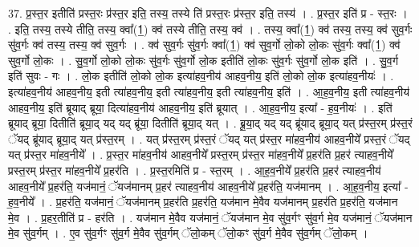 \documentclass[17pt]{extarticle}
\begin{document}
37. प्र॒स्त॒र इतीति॑ प्रस्त॒रः प्र॑स्त॒र इति॒ तस्य॒ तस्ये ति॑ प्रस्त॒रः प्र॑स्त॒र इति॒ तस्य॑ । . प्र॒स्त॒र इति॑ प्र - स्त॒रः । . इति॒ तस्य॒ तस्ये तीति॒ तस्य॒ क्वा᳚(1॒) क्व॑ तस्ये तीति॒ तस्य॒ क्व॑ । . तस्य॒ क्वा᳚(1॒) क्व॑ तस्य॒ तस्य॒ क्व॑ सुव॒र्गः सु॑व॒र्गः क्व॑ तस्य॒ तस्य॒ क्व॑ सुव॒र्गः । . क्व॑ सुव॒र्गः सु॑व॒र्गः क्वा᳚(1॒) क्व॑ सुव॒र्गो लो॒को लो॒कः सु॑व॒र्गः क्वा᳚(1॒) क्व॑ सुव॒र्गो लो॒कः । . सु॒व॒र्गो लो॒को लो॒कः सु॑व॒र्गः सु॑व॒र्गो लो॒क इतीति॑ लो॒कः सु॑व॒र्गः सु॑व॒र्गो लो॒क इति॑ । . सु॒व॒र्ग इति॑ सुवः - गः । . लो॒क इतीति॑ लो॒को लो॒क इत्या॑हव॒नीय॑ आहव॒नीय॒ इति॑ लो॒को लो॒क इत्या॑हव॒नीयः॑ । . इत्या॑हव॒नीय॑ आहव॒नीय॒ इती त्या॑हव॒नीय॒ इती त्या॑हव॒नीय॒ इती त्या॑हव॒नीय॒ इति॑ । . आ॒ह॒व॒नीय॒ इती त्या॑हव॒नीय॑ आहव॒नीय॒ इति॑ ब्रूयाद् ब्रूया॒ दित्या॑हव॒नीय॑ आहव॒नीय॒ इति॑ ब्रूयात् । . आ॒ह॒व॒नीय॒ इत्या᳚ - ह॒व॒नीयः॑ । . इति॑ ब्रूयाद् ब्रूया॒ दितीति॑ ब्रूया॒द् यद् यद् ब्रू॑या॒ दितीति॑ ब्रूया॒द् यत् । . ब्रू॒या॒द् यद् यद् ब्रू॑याद् ब्रूया॒द् यत् प्र॑स्त॒रम् प्र॑स्त॒रं ॅयद् ब्रू॑याद् ब्रूया॒द् यत् प्र॑स्त॒रम् । . यत् प्र॑स्त॒रम् प्र॑स्त॒रं ॅयद् यत् प्र॑स्त॒र मा॑हव॒नीय॑ आहव॒नीये᳚ प्रस्त॒रं ॅयद् यत् प्र॑स्त॒र मा॑हव॒नीये᳚ । . प्र॒स्त॒र मा॑हव॒नीय॑ आहव॒नीये᳚ प्रस्त॒रम् प्र॑स्त॒र मा॑हव॒नीये᳚ प्र॒हर॑ति प्र॒हर॑ त्याहव॒नीये᳚ प्रस्त॒रम् प्र॑स्त॒र मा॑हव॒नीये᳚ प्र॒हर॑ति । . प्र॒स्त॒रमिति॑ प्र - स्त॒रम् । . आ॒ह॒व॒नीये᳚ प्र॒हर॑ति प्र॒हर॑ त्याहव॒नीय॑ आहव॒नीये᳚ प्र॒हर॑ति॒ यज॑मानं॒ ॅयज॑मानम् प्र॒हर॑ त्याहव॒नीय॑ आहव॒नीये᳚ प्र॒हर॑ति॒ यज॑मानम् । . आ॒ह॒व॒नीय॒ इत्या᳚ - ह॒व॒नीये᳚ । . प्र॒हर॑ति॒ यज॑मानं॒ ॅयज॑मानम् प्र॒हर॑ति प्र॒हर॑ति॒ यज॑मान मे॒वैव यज॑मानम् प्र॒हर॑ति प्र॒हर॑ति॒ यज॑मान मे॒व । . प्र॒हर॒तीति॑ प्र - हर॑ति । . यज॑मान मे॒वैव यज॑मानं॒ ॅयज॑मान मे॒व सु॑व॒र्गꣳ सु॑व॒र्ग मे॒व यज॑मानं॒ ॅयज॑मान मे॒व सु॑व॒र्गम् । . ए॒व सु॑व॒र्गꣳ सु॑व॒र्ग मे॒वैव सु॑व॒र्गम् ॅलो॒कम् ॅलो॒कꣳ सु॑व॒र्ग मे॒वैव सु॑व॒र्गम् ॅलो॒कम् । \newline
\pagebreak
{}
\end{document}
